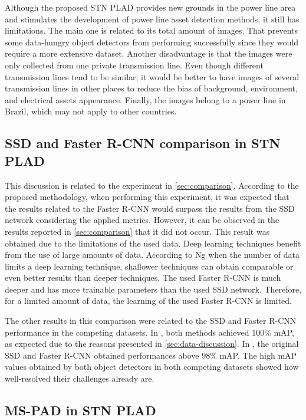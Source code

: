 \documentclass[10pt,conference]{IEEEtran}
\begin{document}
Although the proposed STN PLAD provides new grounds in the power line area and stimulates the development of power line asset detection methods, it still has limitations. The main one is related to its total amount of images. That prevents some data-hungry object detectors from performing successfully since they would require a more extensive dataset. Another disadvantage is that the images were only collected from one private transmission line. Even though different transmission lines tend to be similar, it would be better to have images of several transmission lines in other places to reduce the bias of background, environment, and electrical assets appearance. Finally, the images belong to a power line in Brazil, which may not apply to other countries.

\subsection{SSD and Faster R-CNN comparison in STN PLAD}

This discussion is related to the experiment in \autoref{sec:comparison}. According to the proposed methodology, when performing this experiment, it was expected that the results related to the Faster R-CNN would surpass the results from the SSD network considering the applied metrics. However, it can be observed in the results reported in \autoref{sec:comparison} that it did not occur. This result was obtained due to the limitations of the used data. Deep learning techniques benefit from the use of large amounts of data. According to Ng \cite{ng2017machine} \cite{tang2018canadian} when the number of data limits a deep learning technique, shallower techniques can obtain comparable or even better results than deeper techniques. The used Faster R-CNN is much deeper and has more trainable parameters than the used SSD network. Therefore, for a limited amount of data, the learning of the used Faster R-CNN is limited.

The other results in this comparison were related to the SSD and Faster R-CNN performance in the competing datasets. In \cite{tomaszewski2018collection}, both methods achieved 100\% mAP, as expected due to the reasons presented in \autoref{sec:data-discussion}. In \cite{tao2018cplid}, the original SSD and Faster R-CNN obtained performances above 98\% mAP. The high mAP values obtained by both object detectors in both competing datasets showed how well-resolved their challenges already are.

\subsection{MS-PAD in STN PLAD}
\end{document}
